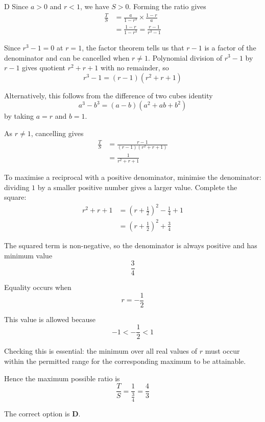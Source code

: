 \documentclass[11pt,a4paper]{article}
\begin{document}
\begin{enumerate}[label=\textbf{\arabic*.},leftmargin=*,itemsep=0pt,start=5]
\begin{djsSolution}{D}
Since $a>0$ and $r<1$, we have $S>0$. Forming the ratio gives
\[
\begin{aligned}
\frac{T}{S}
&=\frac{a}{1-r^3}\times\frac{1-r}{a}\\[8pt]
&=\frac{1-r}{1-r^3}
=\frac{r-1}{r^3-1}
\end{aligned}
\]

Since $r^3-1=0$ at $r=1$, the factor theorem tells us that $r-1$ is a factor of the denominator and can be cancelled when $r\ne1$. Polynomial division of $r^3-1$ by $r-1$ gives quotient $r^2+r+1$ with no remainder, so
\[
r^3-1=(r-1)(r^2+r+1)
\]

Alternatively, this follows from the difference of two cubes identity
\[
a^3-b^3=(a-b)(a^2+ab+b^2)
\]
by taking $a=r$ and $b=1$.

As $r\ne1$, cancelling gives
\[
\begin{aligned}
\frac{T}{S}
&=\frac{r-1}{(r-1)(r^2+r+1)}\\[8pt]
&=\frac{1}{r^2+r+1}
\end{aligned}
\]

To maximise a reciprocal with a positive denominator, minimise the denominator: dividing $1$ by a smaller positive number gives a larger value. Complete the square:
\[
\begin{aligned}
r^2+r+1
&=\left(r+\frac12\right)^2-\frac14+1\\[8pt]
&=\left(r+\frac12\right)^2+\frac34
\end{aligned}
\]

The squared term is non-negative, so the denominator is always positive and has minimum value
\[
\frac34
\]

Equality occurs when
\[
r=-\frac12
\]

This value is allowed because
\[
-1<-\frac12<1
\]

Checking this is essential: the minimum over all real values of $r$ must occur within the permitted range for the corresponding maximum to be attainable.

Hence the maximum possible ratio is
\[
\frac{T}{S}=\frac{1}{\frac34}=\frac43
\]

The correct option is \textbf{D}.
\end{djsSolution}
\end{enumerate}
\clearpage
\thispagestyle{djssolutions}
\vspace*{8pt}
\end{document}
